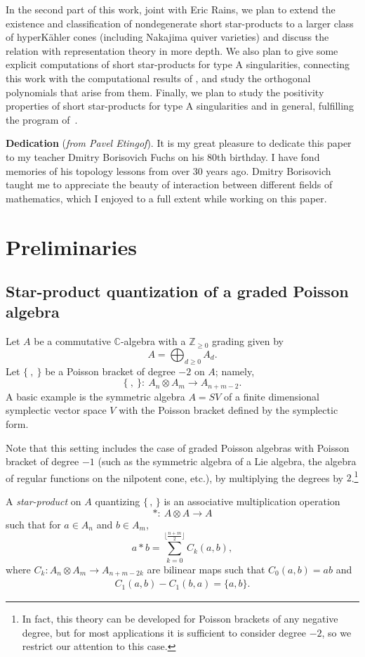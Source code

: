 \documentclass[pdftex]{sigma}
\numberwithin{equation}{section}
\newcommand{\Z}{\mathbb{Z}}
\begin{document}
In the second part of this work, joint with Eric Rains, we plan to extend the existence and classification of nondegenerate short star-products to a larger class of hyperK\"ahler cones (including Nakajima quiver varieties) and discuss the relation with representation theory in more depth. We also plan to give some explicit computations of short star-products for type A singularities, connecting this work with the computational results of \cite{BPR,DPY}, and study the orthogonal polynomials that arise from them. Finally, we plan to study the positivity properties of short star-products for type A singularities and in general, fulfilling the program of~\cite{BPR}.

{\bf Dedication} ({\sl from Pavel Etingof}). It is my great pleasure to dedicate this paper to my teacher Dmitry Borisovich Fuchs on his 80th birthday. I have fond memories of his topology lessons from over 30 years ago. Dmitry Borisovich taught me to appreciate the beauty of interaction between different fields of mathematics, which I enjoyed to a full extent while working on this paper.

\section{Preliminaries}\label{section2}

\subsection{Star-product quantization of a graded Poisson algebra}
Let $A$ be a commutative ${\mathbb C}$-algebra with a $\Z_{\geq 0}$ grading given by
\[
A = \bigoplus_{d \geq 0} A_d.
\]
Let $\{~,~\}$ be a Poisson bracket of degree $-2$ on $A$; namely,
\[
\{~,~\} \colon \ A_n \otimes A_m \to A_{n+m-2}.
\]
A basic example is the symmetric algebra $A=SV$ of a finite dimensional symplectic vector space $V$
with the Poisson bracket defined by the symplectic form.

Note that this setting includes the case of graded Poisson algebras with Poisson bracket of degree $-1$ (such as the symmetric algebra of a Lie algebra, the algebra of regular functions on the nilpotent cone, etc.), by multiplying the degrees by $2$.\footnote{In fact, this theory can be developed for Poisson brackets of any negative degree, but for most applications it is sufficient to consider degree $-2$, so we restrict our attention to this case.}

\begin{Definition}
A \emph{star-product} on $A$ quantizing $\lbrace\,,\,\rbrace$ is an associative multiplication operation
\[
*\colon \ A \otimes A \to A
\]
such that for $a \in A_n$ and $b \in A_m$,
\[
a*b = \sum_{k = 0}^{\lfloor \frac{n+m}{2}\rfloor} C_k(a,b),
\]
where $C_k \colon A_n \otimes A_m \to A_{n+m-2k}$ are bilinear maps such that $C_0(a,b) = a b$ and
\begin{gather*}
C_1(a,b) - C_1(b,a) = \{a,b\}.
\end{gather*}
\end{Definition}
\end{document}
